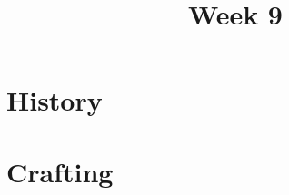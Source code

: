 \documentclass[11pt]{article}
\title{Week 9}
\date{}
\begin{document}
    \maketitle

    \section*{History}
        \begin{itemize}
        \end{itemize}

    \section*{Crafting}
        \begin{itemize}
        \end{itemize}
\end{document}
